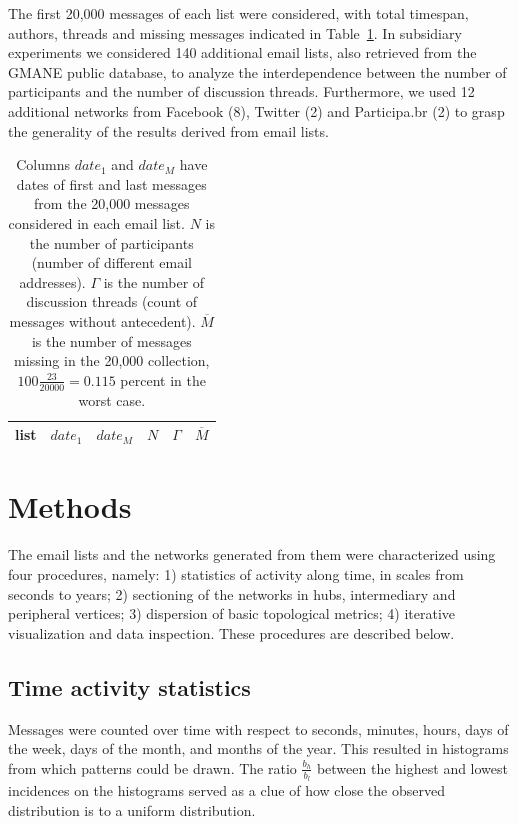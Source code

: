 \documentclass[%
	aip,
	jmp,%
	amsmath,amssymb,
	reprint,%
]{revtex4-1}
\begin{document}
The first 20,000 messages of each list were considered, with total timespan, authors, threads and missing messages indicated in Table~\ref{tab:genLists}.
In subsidiary experiments we considered 140 additional email lists, also retrieved from the GMANE public database, to analyze the interdependence between the number of participants and the number of discussion threads. Furthermore, we used 12 additional networks from Facebook (8), Twitter (2) and Participa.br (2) to grasp the generality of the results derived from email lists.

\begin{table}
	\centering
	\caption{Columns $date_1$ and $date_M$ have dates of first and last messages from the 20,000 messages considered in each email list.
		$N$ is the number of participants (number of different email addresses).
		$\Gamma$ is the number of discussion threads (count of messages without antecedent).
		$\overline{M}$ is the number of messages missing in the 20,000 collection, $100\frac{23}{20000}=0.115$ percent in the worst case.
	}
	\label{tab:genLists}
	\begin{tabular}{|l|c|c|c|c|c|}\hline
		list & $date_1$ & $date_{M}$    & $N$  & $\Gamma$ & $\overline{M}$ \\\hline
		
	\end{tabular}
\end{table}


\section{Methods}\label{sec:carac}
The email lists and the networks generated from them were characterized using four procedures, namely: 1) statistics of activity along time, in scales from seconds to years; 2) sectioning of the networks in hubs, intermediary and peripheral vertices; 3) dispersion of basic topological metrics; 4) iterative visualization and data inspection.
These procedures are described below.

\subsection{Time activity statistics}\label{sec:mtime}
Messages were counted over time with respect to seconds, minutes, hours, days of the week, days of the month, and months of the year. This resulted in histograms from which patterns could be drawn. The ratio $\frac{b_h}{b_l}$ between the highest and lowest incidences on the histograms served as a clue of how close the observed distribution is to a uniform distribution.
\end{document}
